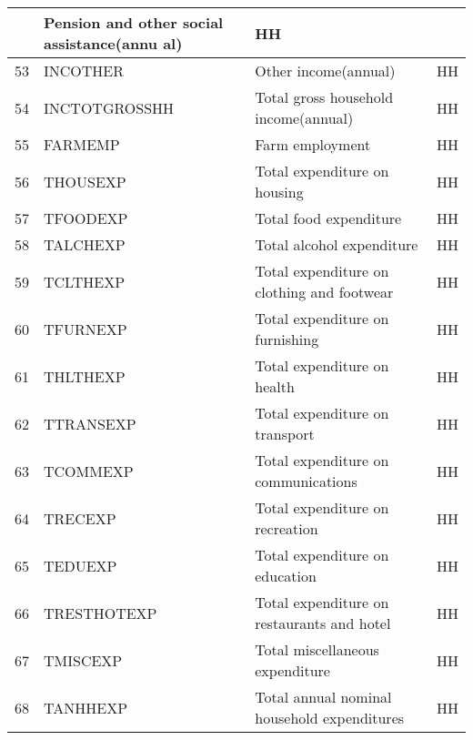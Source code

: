 \documentclass[letterpaper,10pt,english]{sphinxmanual}
\begin{document}
\begin{savenotes}
\begin{longtable}{|l|l|l|l|}
&
Pension and
other social
assistance(annu
al)
&
HH
\\
\hline
53
&
INCOTHER
&
Other
income(annual)
&
HH
\\
\hline
54
&
INCTOTGROSSHH
&
Total gross
household
income(annual)
&
HH
\\
\hline
55
&
FARMEMP
&
Farm employment
&
HH
\\
\hline
56
&
THOUSEXP
&
Total
expenditure on
housing
&
HH
\\
\hline
57
&
TFOODEXP
&
Total food
expenditure
&
HH
\\
\hline
58
&
TALCHEXP
&
Total alcohol
expenditure
&
HH
\\
\hline
59
&
TCLTHEXP
&
Total
expenditure on
clothing and
footwear
&
HH
\\
\hline
60
&
TFURNEXP
&
Total
expenditure on
furnishing
&
HH
\\
\hline
61
&
THLTHEXP
&
Total
expenditure on
health
&
HH
\\
\hline
62
&
TTRANSEXP
&
Total
expenditure on
transport
&
HH
\\
\hline
63
&
TCOMMEXP
&
Total
expenditure on
communications
&
HH
\\
\hline
64
&
TRECEXP
&
Total
expenditure on
recreation
&
HH
\\
\hline
65
&
TEDUEXP
&
Total
expenditure on
education
&
HH
\\
\hline
66
&
TRESTHOTEXP
&
Total
expenditure on
restaurants and
hotel
&
HH
\\
\hline
67
&
TMISCEXP
&
Total
miscellaneous
expenditure
&
HH
\\
\hline
68
&
TANHHEXP
&
Total annual
nominal
household
expenditures
&
HH
\\
\hline
\end{longtable}\sphinxatlongtableend\end{savenotes}


\section{ }
\label{\detokenize{appendices:appendix-b-example-of-blanket-agreement-for-suf}}
\end{document}
